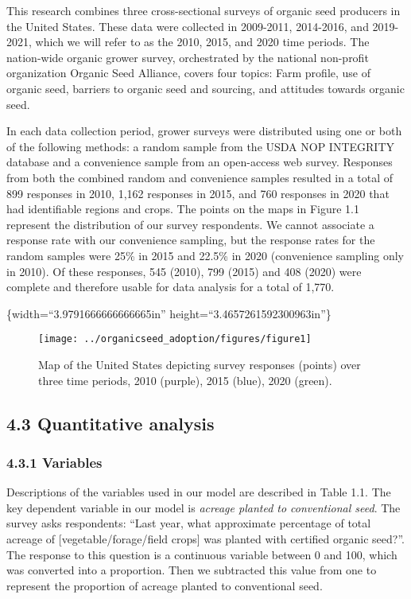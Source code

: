\documentclass[twoside,12pt,final]{ucthesis-CA2012}
\begin{document}
\begin{ucmainmatter}
This research combines three cross-sectional surveys of organic seed
producers in the United States. These data were collected in 2009-2011,
2014-2016, and 2019-2021, which we will refer to as the 2010, 2015, and
2020 time periods. The nation-wide organic grower survey, orchestrated
by the national non-profit organization Organic Seed Alliance, covers
four topics: Farm profile, use of organic seed, barriers to organic seed
and sourcing, and attitudes towards organic seed.

In each data collection period, grower surveys were distributed using
one or both of the following methods: a random sample from the USDA NOP
INTEGRITY database and a convenience sample from an open-access web
survey. Responses from both the combined random and convenience samples
resulted in a total of 899 responses in 2010, 1,162 responses in 2015,
and 760 responses in 2020 that had identifiable regions and crops. The
points on the maps in Figure 1.1 represent the distribution of our
survey respondents. We cannot associate a response rate with our
convenience sampling, but the response rates for the random samples were
25\% in 2015 and 22.5\% in 2020 (convenience sampling only in 2010). Of
these responses, 545 (2010), 799 (2015) and 408 (2020) were complete and
therefore usable for data analysis for a total of 1,770.

\{width=``3.9791666666666665in''
height=``3.4657261592300963in''\}
\begin{figure}

{\centering \texttt{[image: ../organicseed\_adoption/figures/figure1]} 

}

\caption{Map of the United States depicting survey responses (points) over three time periods, 2010 (purple), 2015 (blue), 2020 (green).}\label{fig:unnamed-chunk-9}
\end{figure}
\hypertarget{quantitative-analysis}{%
\subsection{4.3 Quantitative analysis}\label{quantitative-analysis}}

\hypertarget{variables}{%
\subsubsection{4.3.1 Variables}\label{variables}}

Descriptions of the variables used in our model are described in Table
1.1. The key dependent variable in our model is \emph{acreage planted to
conventional seed}. The survey asks respondents: ``Last year, what
approximate percentage of total acreage of {[}vegetable/forage/field
crops{]} was planted with certified organic seed?''. The response to this
question is a continuous variable between 0 and 100, which was converted
into a proportion. Then we subtracted this value from one to represent
the proportion of acreage planted to conventional seed.


\end{ucmainmatter}
\end{document}
